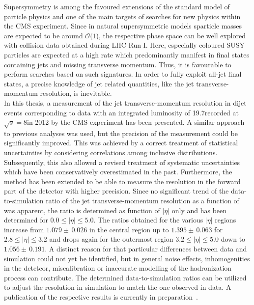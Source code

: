 Supersymmetry is among the favoured extensions of the standard model of particle physics and one of the main targets of searches for new physics within the CMS experiment. Since in natural supersymmetric models sparticle masses are expected to be around $\mathcal{O}(1$\tev), the respective phase space can be well explored with \pp collision data obtained during LHC Run I. Here, especially coloured SUSY particles are expected at a high rate which predominantly manifest in final states containing jets and missing transverse momentum. Thus, it is favourable to perform searches based on such signatures. In order to fully exploit all-jet final states, a precise knowledge of jet related quantities, like the jet transverse-momentum resolution, is inevitable. \\
In this thesis, a measurement of the jet transverse-momentum resolution in dijet events corresponding to data with an integrated luminosity of 19.7\fbinv recorded at $\sqrt{s}=8$\tev in 2012 by the CMS experiment has been presented. A similar approach to previous analyses was used, but the precision of the measurement could be significantly improved. This was achieved by a correct treatment of statistical uncertainties by considering correlations among inclusive distributions. Subsequently, this also allowed a revised treatment of systematic uncertainties which have been conservatively overestimated in the past. Furthermore, the method has been extended to be able to measure the resolution in the forward part of the detector with higher precision. Since no significant trend of the data-to-simulation ratio of the jet transverse-momentum resolution as a function of \ptave was apparent, the ratio is determined as function of $|\eta|$ only and has been determined for $0.0 \leq |\eta| \leq 5.0$. The ratios obtained for the various $|\eta|$ regions increase from $1.079\pm \, 0.026$ in the central region up to $1.395\pm \, 0.063$ for $2.8 \leq |\eta| \leq 3.2$ and drops again for the outermost region $3.2 \leq |\eta| \leq 5.0$ down to $1.056\pm \, 0.191$. A distinct reason for that particular differences between data and simulation could not yet be identified, but in general noise effects, inhomogenities in the detetcor, miscalibration or inaccurate modelling of the hadronization process can contribute. The determined data-to-simulation ratios can be utilized to adjust the resolution in simulation to match the one observed in data. A publication of the respective results is currently in preparation~\cite{CMS-JME-13-004}. \\
